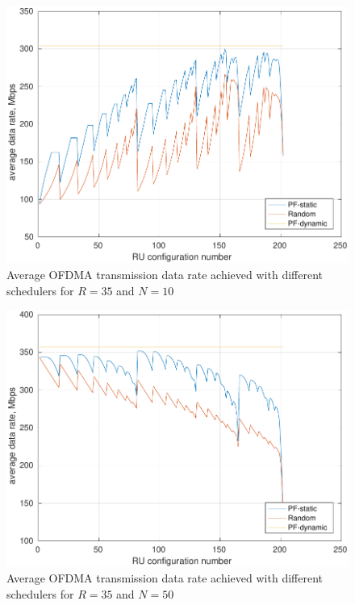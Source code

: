 \documentclass[conference]{IEEEtran}
\begin{document}
\begin{figure}[!tbp]
	\centering
	\includegraphics[width=0.6\linewidth]{./pic/n_10.pdf}
	\caption{Average OFDMA transmission data rate achieved with different schedulers for $R=35$ and $N=10$ }
	\label{figure:n_10}
\end{figure}
%

\begin{figure}[!tbp]
	\centering
	\includegraphics[width=0.6\linewidth]{./pic/n_50.pdf}
	\caption{Average OFDMA transmission data rate achieved with different schedulers for $R=35$ and $N=50$ }
	\label{figure:n_50}
\end{figure}
\end{document}
